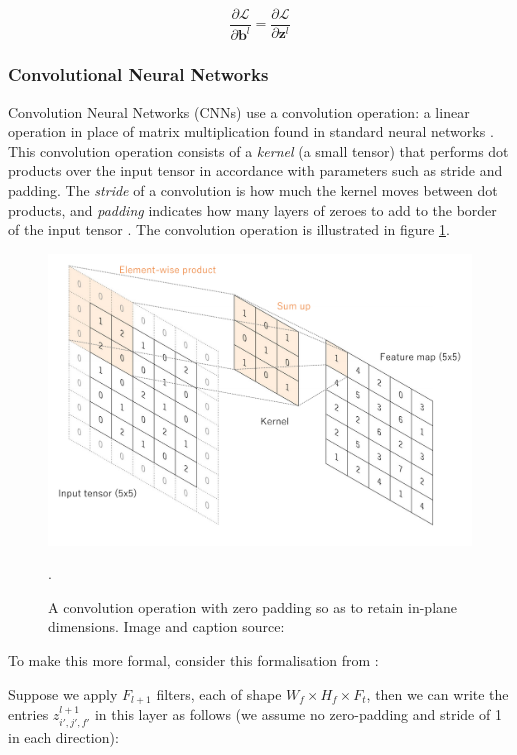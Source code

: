 \[\frac{\partial \mathcal{L}}{\partial \boldsymbol{b}^l} =\frac{\partial \mathcal{L}}{\partial \boldsymbol{z}^l}\]



\subsubsection{Convolutional Neural Networks}
Convolution Neural Networks (CNNs) use a convolution operation: a linear operation in place of matrix multiplication found in standard neural networks \cite{cnn}. This convolution operation consists of a \textit{kernel} (a small tensor) that performs dot products over the input tensor in accordance with parameters such as stride and padding. The \textit{stride} of a convolution is how much the kernel moves between dot products, and \textit{padding} indicates how many layers of zeroes to add to the border of the input tensor \cite{cnn}. The convolution operation is illustrated in figure \ref{fig:cnn}.

\begin{figure}
    \centering
    \includegraphics[scale = 0.25]{images/cnn.png}
    \caption{A convolution operation with zero padding so as to retain in-plane dimensions. Image and caption source: \cite{cnnfig}}.
    \label{fig:cnn}
\end{figure}

To make this more formal, consider this formalisation from \cite{csmlnotes}:

Suppose we apply $F_{l+1}$ filters, each of shape $W_f \times H_f \times F_t$, then we can write the entries $z_{i',j',f'}^{l+1}$ in this layer as follows (we assume no zero-padding and stride of 1 in each direction):




